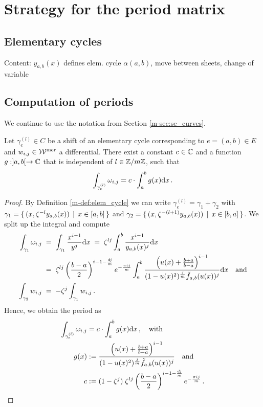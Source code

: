 \documentclass[main.tex]{subfiles}
\begin{document}
  \section{Strategy for the period matrix}

   \subsection{Elementary cycles}
    Content: $y_{a,b}(x)$ defines elem. cycle $\alpha(a,b)$, move between sheets, change of variable
  
  \subsection{Computation of periods}
  
  We continue to use the notation from Section \ref{m-sec:se_curves}.
  
  \begin{thm}\label{thm:periods}
   Let $\gamma_e^{(l)} \in C$ be a shift of an elementary cycle corresponding to $e = (a,b) \in E$ and $w_{i,j} \in \mathcal{W}^{\text{mer}}$ a differential. There exist a constant $c \in \mathbb{C}$ 
   and a function $g:]a,b[ \rightarrow \mathbb{C}$
   that is independent of $l \in \mathbb{Z}/m\mathbb{Z}$, such that
   \begin{align}
    \int_{\gamma_e^{(l)}} \omega_{i,j} = c \cdot \int_a^b g(x)\mathrm d x\,.
   \end{align}

  \end{thm}
  \begin{proof}
    By Definition \ref{m-def:elem_cycle} we can write $\gamma_e^{(l)} = \gamma_1 + \gamma_2$ with $\gamma_1 = \{ \, (x,\zeta^{-l}y_{a,b}(x)) \, \mid \, x \in [a,b] \, \}$ and
    $\gamma_2 = \{ \, (x,\zeta^{-(l+1)}y_{a,b}(x)) \, \mid \, x \in [b,a] \, \}$. We split up the integral and compute
    \begin{align}\label{eq:thm_periods_1}
     \int_{\gamma_1} \omega_{i,j} \; & = \; \int_{\gamma_1} \frac{x^{i-1}}{y^j} \mathrm d x \; = \; \zeta^{lj} \int_a^b \frac{x^{i-1}}{y_{a,b}(x)^j} \mathrm d x \\ \; & = \; 
     \zeta^{lj} \left(\frac{b-a}{2}\right)^{i-1-\frac{dj}{m}} e^{-\frac{\pi i j}{m}} 
     \int_a^b \frac{\left(u(x)+\frac{b+a}{b-a}\right)^{i-1}}{(1-u(x)^2)^{\frac{j}{m}}\tilde{f}_{a,b}(u(x))^j} \mathrm d x \quad \text{and} \\
    \int_{\gamma_2} w_{i,j} \; & = \; - \zeta^j \int_{\gamma_1} w_{i,j}\,.
  \end{align}
  Hence, we obtain the period as
  \begin{align}
   \int_{\gamma_e^{(l)}} \omega_{i,j} & =  c \cdot \int_a^b g(x)\mathrm d x\,, \quad \text{with} \\
   g(x) & := \frac{\left(u(x)+\frac{b+a}{b-a}\right)^{i-1}}{(1-u(x)^2)^{\frac{j}{m}}\tilde{f}_{a,b}(u(x))^j} \quad \text{and} \\
      c & := (1-\zeta^j) \; \zeta^{lj} \left(\frac{b-a}{2}\right)^{i-1-\frac{dj}{m}} e^{-\frac{\pi i j}{m}}\,.
  \end{align}
  \end{proof}
  
 
\biblio
\end{document}
